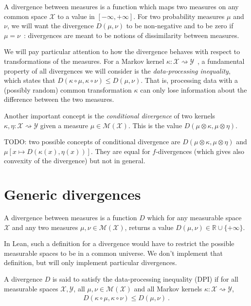 A divergence between measures is a function which maps two measures on any common space $\mathcal X$ to a value in $[-\infty, +\infty]$.
For two probability measures $\mu$ and $\nu$, we will want the divergence $D(\mu, \nu)$ to be non-negative and to be zero if $\mu = \nu$~: divergences are meant to be notions of dissimilarity between measures.

We will pay particular attention to how the divergence behaves with respect to transformations of the measures.
For a Markov kernel $\kappa : \mathcal X \rightsquigarrow \mathcal Y$~, a fundamental property of all divergences we will consider is the \emph{data-processing inequality}, which states that $D(\kappa \circ \mu, \kappa \circ \nu) \le D(\mu, \nu)$.
That is, processing data with a (possibly random) common transformation $\kappa$ can only lose information about the difference between the two measures.

Another important concept is the \emph{conditional divergence} of two kernels $\kappa, \eta : \mathcal X \rightsquigarrow \mathcal Y$ given a measure $\mu \in \mathcal M(\mathcal X)$. This is the value $D(\mu \otimes \kappa, \mu \otimes \eta)$.

TODO: two possible concepts of conditional divergence are $D(\mu \otimes \kappa, \mu \otimes \eta)$ and $\mu\left[x \mapsto D(\kappa(x), \eta(x))\right]$. They are equal for $f$-divergences (which gives also convexity of the divergence) but not in general. 

\section{Generic divergences}

\begin{definition}[Divergence]
  \label{def:div}
  \uses{}
  A divergence between measures is a function $D$ which for any measurable space $\mathcal X$ and any two measures $\mu, \nu \in \mathcal M(\mathcal X)$, returns a value $D(\mu, \nu) \in \mathbb{R} \cup \{+\infty\}$.
\end{definition}


\begin{leanremark}
In Lean, such a definition for a divergence would have to restrict the possible measurable spaces to be in a common universe.
We don't implement that definition, but will only implement particular divergences.
\end{leanremark}


\begin{definition}
  \label{def:dpi}
  A divergence $D$ is said to satisfy the data-processing inequality (DPI) if for all measurable spaces $\mathcal X, \mathcal Y$, all $\mu, \nu \in \mathcal M(\mathcal X)$ and all Markov kernels $\kappa : \mathcal X \rightsquigarrow \mathcal Y$,
  \begin{align*}
  D(\kappa \circ \mu, \kappa \circ \nu) \le D(\mu, \nu) \: .
  \end{align*}
\end{definition}


